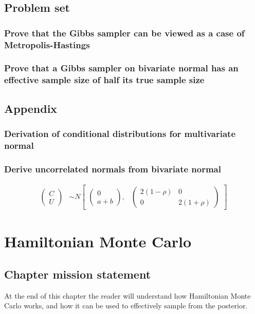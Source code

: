 \documentclass[11pt,fullpage]{book}
\begin{document}
\section{Problem set}
\subsection{Prove that the Gibbs sampler can be viewed as a case of Metropolis-Hastings}
\subsection{Prove that a Gibbs sampler on bivariate normal has an effective sample size of half its true sample size}


\section{Appendix}
\subsection{Derivation of conditional distributions for multivariate normal}
\subsection{Derive uncorrelated normals from bivariate normal}
%
\begin{align*}
\begin{pmatrix}C\\
U
\end{pmatrix} &\sim  N
\begin{bmatrix}
\begin{pmatrix}
0\\
a+b
\end{pmatrix}\!\!,&
\begin{pmatrix}
2(1-\rho) & 0\\
0 & 2(1+\rho)
\end{pmatrix}
\end{bmatrix}
\end{align*}
%

\chapter{Hamiltonian Monte Carlo}\label{chap:HMC}
\section{Chapter mission statement}
At the end of this chapter the reader will understand how Hamiltonian Monte Carlo works, and how it can be used to effectively sample from the posterior.
\end{document}
